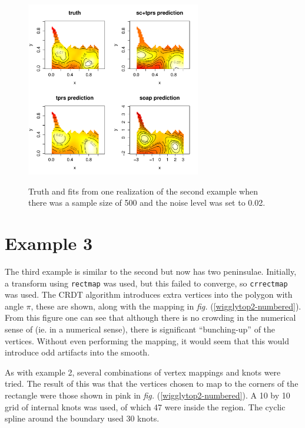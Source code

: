 \documentclass[a4paper,10pt]{amsart}
\newcommand{\fig}[1]{\emph{fig.} (\ref{#1})}
\begin{document}
\begin{figure}
\centering
\includegraphics[width=3in]{figs-otherdomains/wigglytop-real.pdf} \\
\caption{Truth and fits from one realization of the second example when there was a sample size of 500 and the noise level was set to 0.02. }
\label{wigglytop-real}
\end{figure}





\section{Example 3}

The third example is similar to the second but now has two peninsulae. Initially, a transform using \texttt{rectmap} was used, but this failed to converge, so \texttt{crrectmap} was used. The CRDT algorithm introduces extra vertices into the polygon with angle $\pi$, these are shown, along with the mapping in \fig{wigglytop2-numbered}. From this figure one can see that although there is no crowding in the numerical sense of \cite{driscoll} (ie. in a numerical sense), there is significant ``bunching-up'' of the vertices. Without even performing the mapping, it would seem that this would introduce odd artifacts into the smooth.

As with example 2, several combinations of vertex mappings and knots were tried. The result of this was that the vertices chosen to map to the corners of the rectangle were those shown in pink in \fig{wigglytop2-numbered}. A 10 by 10 grid of internal knots was used, of which 47 were inside the region. The cyclic spline around the boundary used 30 knots.
\end{document}
